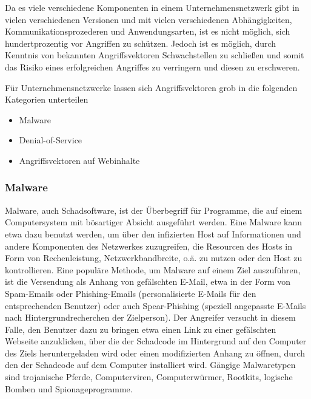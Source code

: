 Da es viele verschiedene Komponenten in einem Unternehmensnetzwerk gibt in vielen verschiedenen Versionen und mit vielen verschiedenen Abhängigkeiten, Kommunikationsprozederen und Anwendungsarten, ist es nicht möglich, sich hundertprozentig vor Angriffen zu schützen. Jedoch ist es möglich, durch Kenntnis von bekannten Angriffsvektoren Schwachstellen zu schließen und somit das Risiko eines erfolgreichen Angriffes zu verringern und diesen zu erschweren.

Für Unternehmensnetzwerke lassen sich Angriffsvektoren grob in die folgenden Kategorien unterteilen \citep{Campbell2016}
\begin{itemize}
\item \glqq Malware\grqq 
\item \glqq Denial-of-Service\grqq
\item \glqq Angriffsvektoren auf Webinhalte \grqq
\end{itemize}


\subsubsection{Malware}
Malware, auch Schadsoftware, ist der Überbegriff für Programme, die auf einem Computersystem mit bösartiger Absicht ausgeführt werden. Eine Malware kann etwa dazu benutzt werden, um über den infizierten Host auf Informationen und andere Komponenten des Netzwerkes zuzugreifen, die Resourcen des Hosts in Form von Rechenleistung, Netzwerkbandbreite, o.ä. zu nutzen oder den Host zu kontrollieren.
Eine populäre Methode, um Malware auf einem Ziel auszuführen, ist die Versendung als Anhang von gefälschten E-Mail, etwa in der Form von Spam-Emails oder  Phishing-Emails (personalisierte E-Mails für den entsprechenden Benutzer) oder auch Spear-Phishing (speziell angepasste E-Mails nach Hintergrundrecherchen der Zielperson). Der Angreifer versucht in diesem Falle, den Benutzer dazu zu bringen etwa einen Link zu einer gefälschten Webseite anzuklicken, über die der Schadcode im Hintergrund auf den Computer des Ziels heruntergeladen wird oder einen modifizierten Anhang zu öffnen, durch den der Schadcode auf dem Computer installiert wird. Gängige Malwaretypen sind trojanische Pferde, Computerviren, Computerwürmer, \glqq Rootkits\grqq , logische Bomben  und Spionageprogramme\citep{Campbell2016}.\\


